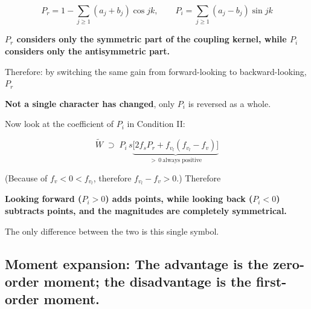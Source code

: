 \documentclass[11pt,a4paper,openany]{book}
\numberwithin{equation}{chapter}
\numberwithin{figure}{chapter}
\numberwithin{table}{chapter}
\begin{document}
\begin{tcolorbox}[keybox]
\begin{equation}
P_r = 1 - \sum_{j\ge1}\left(a_j+b_j\right)\cos jk,
\qquad
P_i = \sum_{j\ge1}\left(a_j-b_j\right)\sin jk
\end{equation}
\end{tcolorbox}

\textbf{$P_r$ considers only the symmetric part of the coupling kernel, while $P_i$ considers only the antisymmetric part.}




 Therefore: by switching the same gain from forward-looking to backward-looking, $P_r$




\textbf{Not a single character has changed}, only $P_i$ is reversed as a whole.




Now look at the coefficient of $P_i$ in Condition II:

\begin{equation}
\widetilde W \;\supset\; P_i\,s\underbrace{\Big[2f_sP_r + f_{v_l}\left(f_{v_l}-f_v\right)\Big]}_{\textstyle >\,0\ \text{always positive}}
\end{equation}

(Because of $f_v<0<f_{v_l}$, therefore $f_{v_l}-f_v>0$.) Therefore










\begin{tcolorbox}[notebox]
\textbf{Looking forward ($P_i>0$) adds points, while looking back ($P_i<0$) subtracts points, and the magnitudes are completely symmetrical.}




The only difference between the two is this single symbol.







\end{tcolorbox}

\subsection{Moment expansion: The advantage is the zero-order moment; the disadvantage is the first-order moment.}
\end{document}
